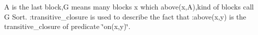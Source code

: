 A is the last block,G means many blocks x which above(x,\+A),kind of blocks call G Sort. \+:transitive\+\_\+closure is used to describe the fact that \+:above(x,y) is the transitive\+\_\+closure of predicate \char`\"{}on(x,y)\char`\"{}. 
